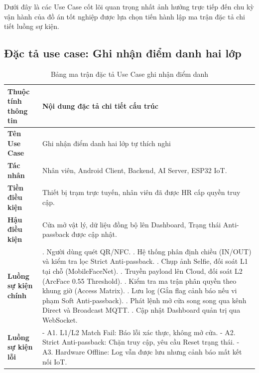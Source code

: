 \documentclass[../DoAn.tex]{subfiles}
\begin{document}
Dưới đây là các Use Case cốt lõi quan trọng nhất ảnh hưởng trực tiếp đến chu kỳ vận hành của đồ án tốt nghiệp được lựa chọn tiến hành lập ma trận đặc tả chi tiết luồng sự kiện.

\subsection{Đặc tả use case: Ghi nhận điểm danh hai lớp}
\label{subsection:2.3.1}

\begin{table}[ht!]
\centering
\small
\renewcommand{\arraystretch}{1.3}
\caption{Bảng ma trận đặc tả Use Case ghi nhận điểm danh}
\label{tab:spec_attendance}
\begin{tabular}{|>{\raggedright\arraybackslash}p{3.5cm}|>{\raggedright\arraybackslash}p{10.1cm}|}
\hline
\textbf{Thuộc tính thông tin} & \textbf{Nội dung đặc tả chi tiết cấu trúc} \\ \hline
\textbf{Tên Use Case} & Ghi nhận điểm danh hai lớp tự thích nghi \\ \hline
\textbf{Tác nhân} & Nhân viên, Android Client, Backend, AI Server, ESP32 IoT. \\ \hline
\textbf{Tiền điều kiện} & Thiết bị trạm trực tuyến, nhân viên đã được HR cấp quyền truy cập. \\ \hline
\textbf{Hậu điều kiện} & Cửa mở vật lý, dữ liệu đồng bộ lên Dashboard, Trạng thái Anti-passback được cập nhật. \\ \hline
\textbf{Luồng sự kiện chính} & 
1. Người dùng quét QR/NFC. \newline
2. Hệ thống phân định chiều (IN/OUT) và kiểm tra lọc Strict Anti-passback. \newline
3. Chụp ảnh Selfie, đối soát L1 tại chỗ (MobileFaceNet). \newline
4. Truyền payload lên Cloud, đối soát L2 (ArcFace 0.55 Threshold). \newline
5. Kiểm tra ma trận phân quyền theo khung giờ (Access Matrix). \newline
6. Lưu log (Gắn flag cảnh báo nếu vi phạm Soft Anti-passback). \newline
7. Phát lệnh mở cửa song song qua kênh Direct và Broadcast MQTT. \newline
8. Cập nhật Dashboard quản trị qua WebSocket. \\ \hline
\textbf{Luồng sự kiện lỗi} &
- A1. L1/L2 Match Fail: Báo lỗi xác thực, không mở cửa. \newline
- A2. Strict Anti-passback: Chặn truy cập, yêu cầu Reset trạng thái. \newline
- A3. Hardware Offline: Log vẫn được lưu nhưng cảnh báo mất kết nối IoT. \\ \hline
\end{tabular}
\end{table}
\end{document}
